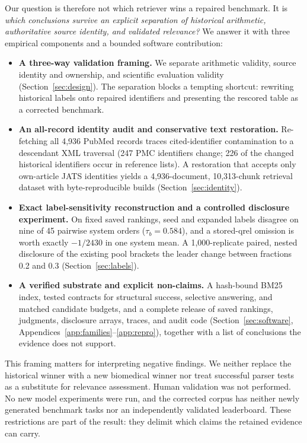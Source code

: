 Our question is therefore not which retriever wins a repaired benchmark. It is \emph{which conclusions survive an explicit separation of historical arithmetic, authoritative source identity, and validated relevance?} We answer it with three empirical components and a bounded software contribution:
\begin{itemize}
\item \textbf{A three-way validation framing.} We separate arithmetic validity, source identity and ownership, and scientific evaluation validity (Section~\ref{sec:design}). The separation blocks a tempting shortcut: rewriting historical labels onto repaired identifiers and presenting the rescored table as a corrected benchmark.
\item \textbf{An all-record identity audit and conservative text restoration.} Re-fetching all 4,936 PubMed records traces cited-identifier contamination to a descendant XML traversal (247 PMC identifiers change; 226 of the changed historical identifiers occur in reference lists). A restoration that accepts only own-article JATS identities yields a 4,936-document, 10,313-chunk retrieval dataset with byte-reproducible builds (Section~\ref{sec:identity}).
\item \textbf{Exact label-sensitivity reconstruction and a controlled disclosure experiment.} On fixed saved rankings, seed and expanded labels disagree on nine of 45 pairwise system orders ($\tau_b=0.584$), and a stored-qrel omission is worth exactly $-1/2430$ in one system mean. A 1,000-replicate paired, nested disclosure of the existing pool brackets the leader change between fractions 0.2 and 0.3 (Section~\ref{sec:labels}).
\item \textbf{A verified substrate and explicit non-claims.} A hash-bound BM25 index, tested contracts for structural success, selective answering, and matched candidate budgets, and a complete release of saved rankings, judgments, disclosure arrays, traces, and audit code (Section~\ref{sec:software}, Appendices~\ref{app:families}--\ref{app:repro}), together with a list of conclusions the evidence does not support.
\end{itemize}

This framing matters for interpreting negative findings. We neither replace the historical winner with a new biomedical winner nor treat successful parser tests as a substitute for relevance assessment. Human validation was not performed. No new model experiments were run, and the corrected corpus has neither newly generated benchmark tasks nor an independently validated leaderboard. These restrictions are part of the result: they delimit which claims the retained evidence can carry.


